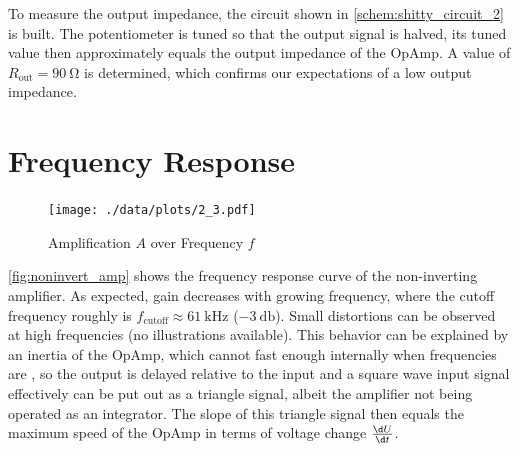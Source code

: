 To measure the output impedance, the circuit shown in \autoref{schem:shitty_circuit_2} is built.
The potentiometer is tuned so that the output signal is halved, its tuned value then approximately equals the output impedance of the OpAmp.
A value of $R_\text{out}=\SI{90}{\ohm}$ is determined, which confirms our expectations of a low output impedance.

\section{Frequency Response}
\begin{figure}[tbp]
	\centering
	\texttt{[image: ./data/plots/2\_3.pdf]}
	\caption{Amplification $A$ over Frequency $f$}
	\label{fig:noninvert_amp}
\end{figure}

\autoref{fig:noninvert_amp} shows the frequency response curve of the non-inverting amplifier.
As expected, gain decreases with growing frequency, where the cutoff frequency roughly is $f_\text{cutoff}\approx\SI{61}{\kilo\hertz}$ ($\SI{-3}{\decibel}$).
Small distortions can be observed at high frequencies (no illustrations available).
This behavior can be explained by an inertia of the OpAmp, which cannot  fast enough internally when frequencies are , so the output is delayed relative to the input and a square wave input signal effectively can be put out as a triangle signal, albeit the amplifier not being operated as an integrator.
The slope of this triangle signal then equals the maximum speed of the OpAmp in terms of voltage change $\frac{\d U}{\d t}$. 
